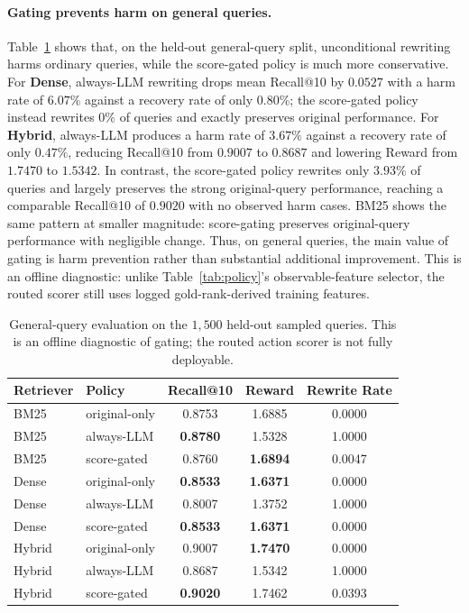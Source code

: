 \documentclass{article}
\begin{document}
\paragraph{Gating prevents harm on general queries.}
Table~\ref{tab:general} shows that, on the held-out general-query split,
unconditional rewriting harms ordinary queries, while the score-gated policy is
much more conservative. For \textbf{Dense}, always-LLM rewriting drops mean
Recall@10 by $0.0527$ with a harm rate of $6.07\%$ against a recovery rate of
only $0.80\%$; the score-gated policy instead rewrites $0\%$ of queries and
exactly preserves original performance. For \textbf{Hybrid}, always-LLM
produces a harm rate of $3.67\%$ against a recovery rate of only $0.47\%$,
reducing Recall@10 from $0.9007$ to $0.8687$ and lowering Reward from $1.7470$
to $1.5342$. In contrast, the score-gated policy rewrites only $3.93\%$ of
queries and largely preserves the strong original-query performance, reaching a
comparable Recall@10 of $0.9020$ with no observed harm cases. BM25 shows the
same pattern at smaller magnitude: score-gating preserves original-query
performance with negligible change. Thus, on general queries, the main value of
gating is harm prevention rather than substantial additional improvement. This
is an offline diagnostic: unlike Table~\ref{tab:policy}'s observable-feature
selector, the routed scorer still uses logged gold-rank-derived training
features.

\begin{table}[ht]
\centering
\caption{General-query evaluation on the $1{,}500$ held-out sampled queries.
This is an offline diagnostic of gating; the routed action scorer is not fully
deployable.}
\label{tab:general}
\begin{tabular}{llccc}
\toprule
Retriever & Policy & Recall@10 & Reward & Rewrite Rate \\
\midrule
BM25   & original-only  & 0.8753 & 1.6885 & 0.0000 \\
BM25   & always-LLM     & \textbf{0.8780} & 1.5328 & 1.0000 \\
BM25   & score-gated    & 0.8760 & \textbf{1.6894} & 0.0047 \\
\midrule
Dense  & original-only  & \textbf{0.8533} & \textbf{1.6371} & 0.0000 \\
Dense  & always-LLM     & 0.8007 & 1.3752 & 1.0000 \\
Dense  & score-gated    & \textbf{0.8533} & \textbf{1.6371} & 0.0000 \\
\midrule
Hybrid & original-only  & 0.9007 & \textbf{1.7470} & 0.0000 \\
Hybrid & always-LLM     & 0.8687 & 1.5342 & 1.0000 \\
Hybrid & score-gated    & \textbf{0.9020} & 1.7462 & 0.0393 \\
\bottomrule
\end{tabular}
\end{table}
\end{document}

